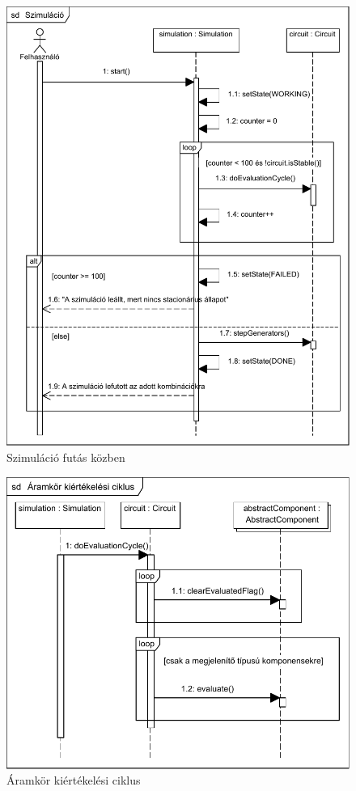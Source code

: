 \begin{figure}[H]
\begin{center}
\includegraphics{chapters/chapter03/seqdiagrams/felhasznalo_szimulacio.pdf}
\caption{Szimuláció futás közben}
\label{fig:user_sim}
\end{center}
\end{figure}

\begin{figure}[H]
\begin{center}
\includegraphics{chapters/chapter03/seqdiagrams/aramkor_szimulacio.pdf}
\caption{Áramkör kiértékelési ciklus}
\label{fig:circuit_sim}
\end{center}
\end{figure}

